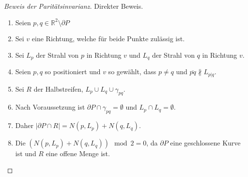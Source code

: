 \begin{proof}[Beweis der Paritätsinvarianz\label{jordan:beweis:paritätsinvarianz}]
    Direkter Beweis.
    \begin{enumerate}
        \item Seien $p,q \in \mathbb{R}^2 \setminus \partial P$
        \item Sei $v$ eine Richtung, welche für beide Punkte zulässig ist.
        \item Sei $L_p$ der Strahl von $p$ in Richtung $v$ und $L_q$ der Strahl von $q$ in Richtung $v$.
        \item Seien $p,q$ so positioniert und $v$ so gewählt, dass $p \neq q$ und $\overline{pq} \nparallel L_{p | q}$.
        \item Sei $R$ der Halbstreifen, $L_p \cup L_q \cup \gamma_{pq}$.
        \item Nach Voraussetzung ist $\partial P \cap \gamma_{pq} = \emptyset$ und $L_p \cap L_q = \emptyset$.
        \item Daher $\left| \partial P \cap R \right| = N(p,L_p) + N(q,L_q)$.
        \item Die $\left(N(p,L_p) + N(q,L_q)\right) \mod 2 = 0$, da $\partial P$ eine geschlossene Kurve ist und $R$ eine offene Menge ist.
    \end{enumerate}
\end{proof}